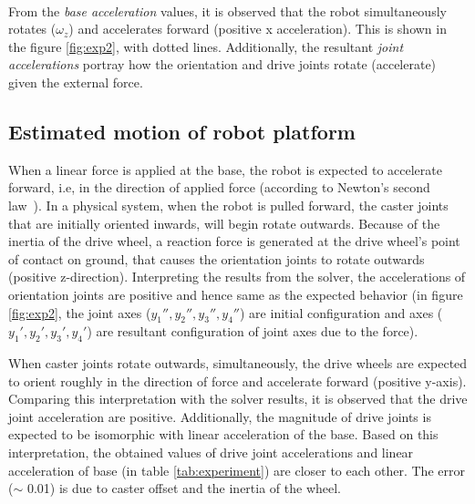 \paragraph{}From the \textit{base acceleration} values, it is observed that the robot simultaneously rotates ($\omega_z$) and accelerates forward (positive x acceleration). This is shown in the figure \ref{fig:exp2}, with dotted lines. Additionally, the resultant \textit{joint accelerations} portray how the orientation and drive joints rotate (accelerate) given the external force. 

\subsection{Estimated motion of robot platform}

When a linear force is applied at the base, the robot is expected to accelerate forward, i.e, in the direction of applied force (according to Newton's second law~\cite{newton1833philosophiae}). In a physical system, when the robot is pulled forward,  the caster joints that are initially oriented inwards, will begin rotate outwards. Because of the inertia of the drive wheel, a reaction force is generated at the drive wheel's point of contact on ground, that causes the orientation joints to rotate outwards (positive z-direction). Interpreting the results from the solver, the accelerations of orientation joints are positive and hence same as the expected behavior (in figure \ref{fig:exp2}, the joint axes ($y_1'', y_2'', y_3'', y_4''$) are initial configuration and axes ($y_1', y_2', y_3', y_4'$) are resultant configuration of joint axes due to the force). 

When caster joints rotate outwards, simultaneously, the drive wheels are expected to orient roughly in the direction of force and accelerate forward (positive y-axis). Comparing this interpretation with the solver results, it is observed that the drive joint acceleration are positive. Additionally, the magnitude of drive joints is expected to be isomorphic with linear acceleration of the base. Based on this interpretation, the obtained values of drive joint accelerations and linear acceleration of base (in table \ref{tab:experiment}) are closer to each other. The error ($\sim$ 0.01) is due to caster offset and the inertia of the wheel.   


